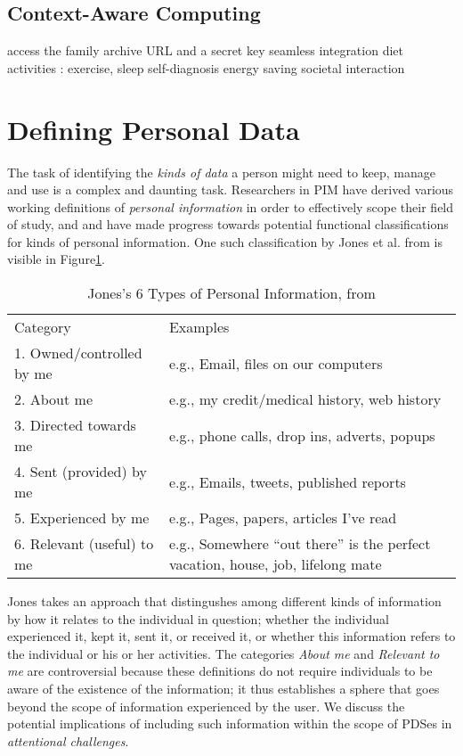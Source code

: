\documentclass[runningheads,a4paper]{llncs}
\begin{document}
\subsection{Context-Aware Computing}

access the family archive
URL and a secret key
seamless integration
  diet
  activities : exercise, sleep
  self-diagnosis
  energy saving
societal interaction

\section{Defining Personal Data}

The task of identifying the \emph{kinds of data} a person might need to keep, manage and use is a complex and daunting task.  Researchers in PIM have derived various working definitions of \emph{personal information} in order to effectively scope their field of study, and and have made progress towards potential functional classifications for kinds of personal information. One such classification by Jones et al. from \cite{kftf} is visible in Figure\ref{fig:jonestype}.

\begin{table}
\begin{tabular}{p{4cm} p{8cm}} 
Category & Examples \\
1. Owned/controlled by me & e.g., Email, files on our computers  \\
2. About me	& e.g., my credit/medical history, web history \\
3. Directed towards me & e.g., phone calls, drop ins, adverts, popups \\
4. Sent (provided) by me & e.g.,  Emails, tweets, published reports  \\
5. Experienced by me & e.g.,  Pages, papers, articles I’ve read \\
6. Relevant (useful) to me	& e.g.,  Somewhere ``out there'' is the perfect vacation, house, job, lifelong mate \\
\end{tabular}
\caption{Jones's 6 Types of Personal Information, from \cite{kftf}}
\label{fig:jonestype}
\end{table}

Jones takes an approach that distingushes among different kinds of information by how it relates to the individual in question; whether the individual experienced it, kept it, sent it, or received it, or whether this information refers to the individual or his or her activities.  The categories \emph{About me} and \emph{Relevant to me} are controversial because these definitions do not require individuals to be aware of the existence of the information; it thus establishes a sphere that goes beyond the scope of information experienced by the user.  We discuss the potential implications of including such information within the scope of PDSes in \emph{attentional challenges}. 
\end{document}

